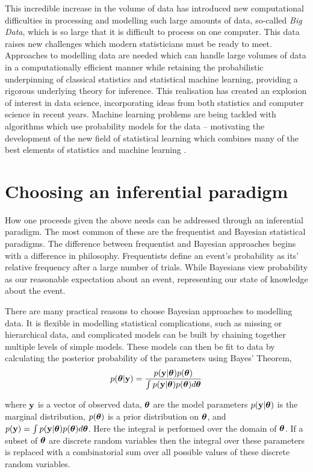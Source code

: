 This incredible increase in the volume of data has introduced new computational
difficulties in processing and modelling such large amounts of data, so-called
\emph{Big Data}, which is so large that it is difficult to process on one
computer. This data raises new challenges which modern statisticians must be
ready to meet. Approaches to modelling data are needed which can handle large
volumes of data in a computationally efficient manner while retaining the
probabilistic underpinning of classical statistics and statistical machine
learning, providing a rigorous underlying theory for inference. This realisation
has created an explosion of interest in data science, incorporating ideas from
both statistics and computer science in recent years. Machine learning problems
are being tackled with algorithms which use probability models for the data --
motivating the development of the new field of statistical learning which
combines many of the best elements of statistics and machine learning
\citep{James:2014:ISL:2517747, MacKay:2002:ITI:971143,
hastie01statisticallearning, Murphy:2012:MLP:2380985}.

\section{Choosing an inferential paradigm}

How one proceeds given the above needs can be addressed through an inferential
paradigm. The most common of these are  the frequentist and Bayesian statistical
paradigms. The difference between frequentist and Bayesian approaches begins
with a difference in philosophy. Frequentists define an event's probability as
its' relative frequency after a large number of trials. While Bayesians view
probability as our reasonable expectation about an event, representing our state
of knowledge about the event.

There are many practical reasons to choose Bayesian approaches to modelling
data. It is flexible in modelling statistical complications, such as missing or
hierarchical data, and complicated models can be built by chaining together
multiple levels of simple models. These models can then be fit to data by
calculating the posterior probability of the parameters using Bayes' Theorem,
\[
	p({\boldsymbol \theta} | {\bf y}) = \frac{p({\bf y} | {\boldsymbol \theta}) p({\boldsymbol \theta})}{\int p({\bf y} | {\boldsymbol \theta}) p({\boldsymbol \theta}) d {\boldsymbol \theta}}
\]

\noindent where ${\bf y}$ is a vector of observed data, ${\boldsymbol \theta}$ are the model
parameters $p({\bf y}|{\boldsymbol \theta})$ is the marginal distribution, $p({\boldsymbol \theta})$ is a
prior distribution on ${\boldsymbol \theta}$, and $p({\bf y})=\int
p({\bf y}|{\boldsymbol \theta})p({\boldsymbol \theta})d{\boldsymbol \theta}$.  Here the integral is performed over the
domain of ${\boldsymbol \theta}$. If a subset of ${\boldsymbol \theta}$ are discrete random variables
then the integral over these parameters is replaced with a combinatorial sum
over all possible values of these discrete random variables.

